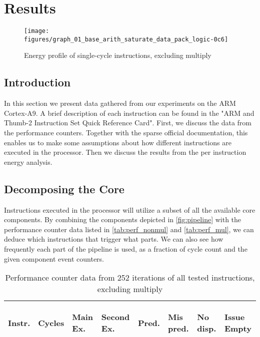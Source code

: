 \section{Results}

\begin{figure*}[ht]
    \centering
    \texttt{[image: figures/graph\_01\_base\_arith\_saturate\_data\_pack\_logic-0c6]}
    \caption{Energy profile of single-cycle instructions, excluding multiply}
    \label{fig:singlecycle}
\end{figure*}

\subsection{Introduction}
In this section we present data gathered from our experiments on the ARM
Cortex-A9. A brief description of each instruction can be found in the "ARM and
Thumb-2 Instruction Set Quick Reference Card"\cite{armasmref}. First, we discuss
the data from the performance counters. Together with the sparse official
documentation, this enables us to make some assumptions about how different
instructions are executed in the processor. Then we discuss the
results from the per instruction energy analysis.

\subsection{Decomposing the Core}
Instructions executed in the processor will utilize a subset
of all the available core components. By combining the components depicted in
\autoref{fig:pipeline} with the performance counter data listed in
\autoref{tab:perf_nonmul} and \autoref{tab:perf_mul}, we can deduce which
instructions that trigger what parts. We can also see how frequently each part
of the pipeline is used, as a fraction of cycle count and the given component
event counters.

\begin{table}
    \centering
    \begin{tabular}{|p{0.7cm}|R{0.8cm}R{0.6cm}R{0.85cm}R{0.6cm}R{0.45cm}R{0.75cm}R{0.72cm}|}
        \hline
        \centering
        Instr. &
        \centering
        Cycles &
        \centering
        Main Ex. &
        \centering
        Second Ex. &
        \centering
        Pred.&
        \centering
        Mis pred.&
        \centering
        No disp. &
        \begin{centering}
        Issue Empty
        \end{centering}
        \\
        \hline
        
        \hline
    \end{tabular}
    \caption{Performance counter data from 252 iterations of all tested
    instructions, excluding multiply}
    \label{tab:perf_nonmul}
    \hfill
\end{table}


